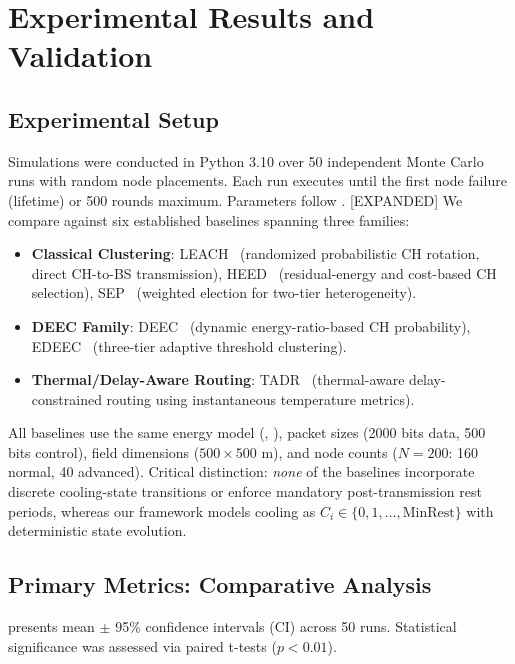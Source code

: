 \section{Experimental Results and Validation}
\label{sec:results}

\subsection{Experimental Setup}
Simulations were conducted in Python 3.10 over 50 independent Monte Carlo runs with random node placements. Each run executes until the first node failure (lifetime) or 500 rounds maximum. Parameters follow . [EXPANDED] We compare against six established baselines spanning three families:
\begin{itemize}[noitemsep]
  \item \textbf{Classical Clustering}: LEACH~\cite{heinzelman2000leach} (randomized probabilistic CH rotation, direct CH-to-BS transmission), HEED~\cite{younis2004heed} (residual-energy and cost-based CH selection), SEP~\cite{smaragdakis2004sep} (weighted election for two-tier heterogeneity).
  \item \textbf{DEEC Family}: DEEC~\cite{qing2006deec} (dynamic energy-ratio-based CH probability), EDEEC~\cite{saini2010edeec} (three-tier adaptive threshold clustering).
  \item \textbf{Thermal/Delay-Aware Routing}: TADR~\cite{chen2019tadr} (thermal-aware delay-constrained routing using instantaneous temperature metrics).
\end{itemize}
All baselines use the same energy model (, ), packet sizes (2000 bits data, 500 bits control), field dimensions ($500 \times 500$ m), and node counts ($N=200$: 160 normal, 40 advanced). Critical distinction: \emph{none} of the baselines incorporate discrete cooling-state transitions or enforce mandatory post-transmission rest periods, whereas our framework models cooling as $C_i \in \{0,1,\ldots,\text{MinRest}\}$ with deterministic state evolution.

\subsection{Primary Metrics: Comparative Analysis}

 presents mean $\pm$ 95\% confidence intervals (CI) across 50 runs. Statistical significance was assessed via paired t-tests ($p<0.01$).

